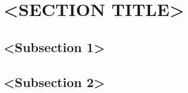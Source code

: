 
\section{<SECTION TITLE>}\label{sec:<slug>}


\subsection{<Subsection 1>}\label{sec:<slug>-part1}


\subsection{<Subsection 2>}\label{sec:<slug>-part2}




